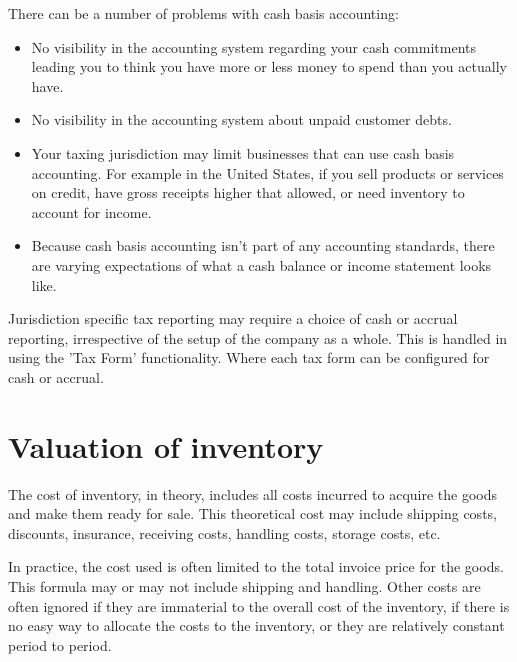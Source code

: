 There can be a number of problems with \gls{cash basis} accounting:
\begin{itemize}
        \item No visibility in the accounting system regarding your cash commitments leading
        you to think you have more or less money to spend than you actually have.
        \item No visibility in the accounting system about unpaid customer debts.
        \item Your taxing jurisdiction may limit businesses that can use cash basis accounting.
        For example in the United States, if you sell products or services on credit,
        have gross receipts higher that allowed, or need inventory to account for income.
        \item  Because cash basis accounting isn't part of any accounting standards, there are varying expectations of what a cash balance or income statement looks like.
\end{itemize}

Jurisdiction specific tax reporting may require a choice of cash or accrual reporting, irrespective of the setup of the company as a whole.
This is handled in \lsmbsp using the 'Tax Form'  functionality.  Where each tax form can be configured for cash or accrual.

\section{Valuation of inventory}
\label{sec-accounting-valuation-inventory}

The cost of inventory, in theory, includes all costs incurred to acquire the goods and make 
them ready for sale. This theoretical cost may include shipping costs, discounts, insurance, 
receiving costs, handling costs, storage costs, etc.

In practice, the cost used is often limited to the total invoice price for the goods.
This formula may or may not include shipping and handling.
Other costs are often ignored if they are immaterial to the overall cost of the inventory, if there
is no easy way to allocate the costs to the inventory, or they are relatively constant period to period.

